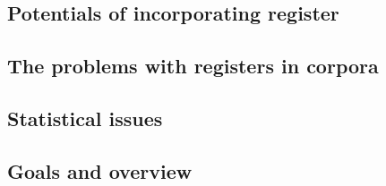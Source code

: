\subsection{Potentials of incorporating register}



\subsection{The problems with registers in corpora}



\subsection{Statistical issues}



\subsection{Goals and overview}






\newpage
